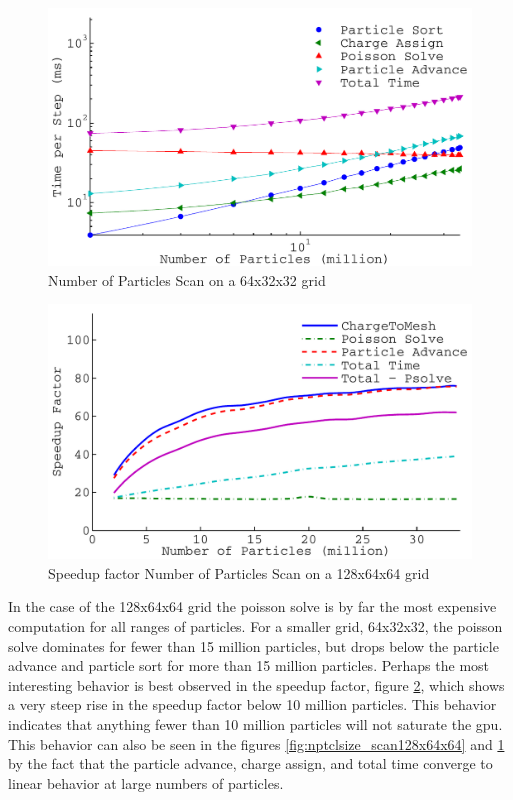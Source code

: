 \begin{figure}
\begin{center}
\includegraphics[width=6in]{performance/nptclsize_scan64x32x32ons8bins.pdf}
\end{center}
\caption{Number of Particles Scan on a 64x32x32 grid}
\label{fig:nptclsize_scan64x32x32}
\end{figure}

\begin{figure}
\begin{center}
\includegraphics[width=6in]{performance/nptclspeedup_scan128x64x64ons8bins.pdf}
\end{center}
\caption{Speedup factor Number of Particles Scan on a 128x64x64 grid}
\label{fig:nptclsize_scan_speedup}
\end{figure}

In the case of the 128x64x64 grid the poisson solve is by far the most expensive computation for all ranges of particles. For a smaller grid, 64x32x32, the poisson solve dominates for fewer than 15 million particles, but drops below the particle advance and particle sort for more than 15 million particles. Perhaps the most interesting behavior is best observed in the speedup factor, figure \ref{fig:nptclsize_scan_speedup}, which shows a very steep rise in the speedup factor below 10 million particles. This behavior indicates that anything fewer than 10 million particles will not saturate the gpu. This behavior can also be seen in the figures \ref{fig:nptclsize_scan128x64x64} and \ref{fig:nptclsize_scan64x32x32} by the fact that the particle advance, charge assign, and total time converge to linear behavior at large numbers of particles. 

